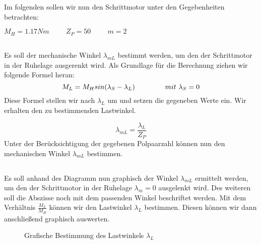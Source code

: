 \chapter{}\label{ch:aufg3}
Im folgenden sollen wir nun den Schrittmotor unter den Gegebenheiten betrachten:
\begin{center}
	$ M_{H} = 1.17Nm \hspace{1cm} Z_{P} = 50 \hspace{1cm} m = 2 $
\end{center}

\section{}\label{sec:3a}
Es soll der mechanische Winkel $ \lambda_{mL} $ bestimmt werden, um den der Schrittmotor in der Ruhelage ausgerenkt wird. Als Grundlage für die Berechnung ziehen wir folgende Formel heran:
\begin{equation}
	M_{L} = M_{H}sin(\lambda_{S}-\lambda_{L}) \hspace{1.5cm} mit~\lambda_{S} = 0
\end{equation}
Diese Formel stellen wir nach $ \lambda_{L} $ um und setzen die gegeneben Werte ein. Wir erhalten den zu bestimmenden Lastwinkel.

\begin{equation}
	\lambda_{mL} = \frac{\lambda_{L}}{Z_{P}}
\end{equation}
Unter der Berücksichtigung der gegebenen Polpaarzahl können nun den mechanischen Winkel $ \lambda_{mL} $ bestimmen.

\section{}\label{sec:3b}
Es soll anhand des Diagramm nun graphisch der Winkel $ \lambda_{mL} $ ermittelt werden, um den der Schrittmotor in der Ruhelage $ \lambda_{m} = 0 $ ausgelenkt wird. Des weiteren soll die Abszisse noch mit dem passenden Winkel beschriftet werden. Mit dem Verhältnis $ \frac{M_{L}}{M_{H}} $ können wir den Lastwinkel $ \lambda_{L} $ bestimmen. Diesen können wir dann anschließend graphisch auswerten.
\begin{figure}[h]
	\centering
	
	\caption{Grafische Bestimmung des Lastwinkels $ \lambda_{L} $}
	\label{fig:3b:lambda}
\end{figure}

